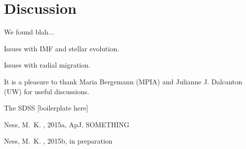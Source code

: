 \documentclass[12pt, preprint]{aastex}
\begin{document}
\section{Discussion}

We found blah...

Issues with IMF and stellar evolution.

Issues with radial migration.

\acknowledgements
It is a pleasure to thank
  Maria Bergemann (MPIA)
  and
  Julianne J. Dalcanton (UW)
for useful discussions.

The SDSS [boilerplate here]

\newcommand{\arxiv}[1]{\href{http://arxiv.org/abs/#1}{arXiv:#1}}
\begin{thebibliography}{}\raggedright

Ness, M.~K. \etal, 2015a, ApJ, SOMETHING

Ness, M.~K. \etal, 2015b, in preparation

\end{thebibliography}
\end{document}

